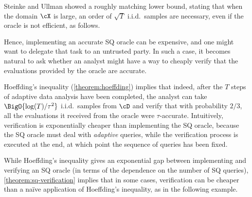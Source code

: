 Steinke and Ullman \cite{DBLP:conf/colt/SteinkeU15} showed a roughly matching lower bound, stating that when the domain $\cX$ is large, an order of $\sqrt{T}$ i.i.d.\ samples are necessary, even if the oracle is not efficient, as follows.


Hence, implementing an accurate SQ oracle can be expensive, and one might want to delegate that task to an untrusted party. In such a case, it becomes natural to ask whether an analyst might have a way to cheaply verify that the evaluations provided by the oracle are accurate. 

Hoeffding's inequality (\cref{theorem:hoeffding}) implies that indeed, after the $T$ steps of adaptive data analysis have been completed, the analyst can take $\BigO{\log(T)/\tau^2}$ i.i.d.\ samples from $\cD$ and verify that with probability $2/3$, all the evaluations it received from the oracle were $\tau$-accurate. Intuitively, verification is exponentially cheaper than implementing the SQ oracle, because the SQ oracle must deal with \emph{adaptive} queries, while the verification process is executed at the end, at which point the sequence of queries has been fixed.

While Hoeffding's inequality gives an exponential gap between implementing and verifying an SQ oracle (in terms of the dependence on the number of SQ queries), \cref{theorem:sq-verification} implies that in some cases, verification can be cheaper than a na\"ive application of Hoeffding's inequality, as in the following example.

